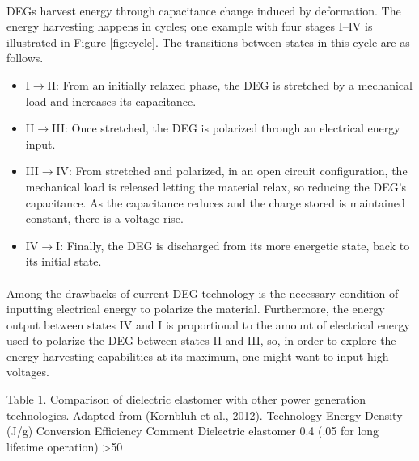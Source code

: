 \paragraph{} DEGs harvest energy through capacitance change induced by  deformation. The energy harvesting happens in cycles; one example with four stages I--IV is illustrated in Figure \ref{fig:cycle}. The transitions between states in this cycle are as follows.
\begin{itemize}
\item I$\rightarrow$II: From an initially relaxed phase, the DEG is stretched by a mechanical load and increases its capacitance.
\item II$\rightarrow$III: Once stretched, the DEG is polarized through an electrical energy input.
\item III$\rightarrow$IV: From stretched and polarized, in an open circuit configuration, the mechanical load is released letting the material relax, so reducing the DEG's capacitance. As the capacitance reduces and the charge stored is maintained constant, there is a voltage rise.
\item IV$\rightarrow$I: Finally, the DEG is discharged from its more energetic state, back to its initial state.
\end{itemize}


\paragraph{} Among the drawbacks of current DEG technology is the necessary condition of inputting electrical energy to polarize the material. Furthermore, the energy output between states IV and I is proportional to the amount of electrical energy used to polarize the DEG between states II and III\cite{DEGCycles}, so, in order to explore the energy harvesting capabilities at its maximum, one might want to input high voltages.

Table 1. Comparison of dielectric elastomer with other power generation technologies. Adapted from (Kornbluh et al., 2012).
Technology	Energy Density (J/g)	Conversion Efficiency	Comment
Dielectric elastomer	0.4 (.05 for long lifetime operation)	>50%

